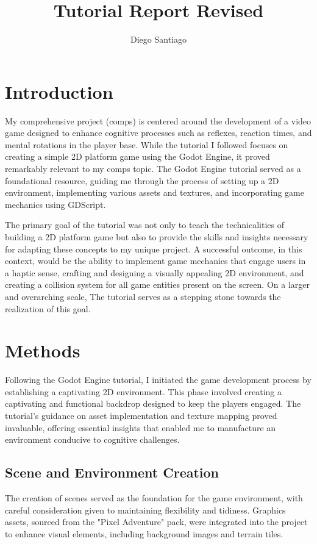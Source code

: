 \documentclass[10pt,twocolumn]{article}
\title{Tutorial Report Revised}
\author{Diego Santiago}
\affiliation{Occidental College}
\begin{document}
\maketitle

\section{Introduction}
My comprehensive project (comps) is centered around the development of a video game designed to enhance cognitive processes such as reflexes, reaction times, and mental rotations in the player base. While the tutorial I followed focuses on creating a simple 2D platform game using the Godot Engine, it proved remarkably relevant to my comps topic. The Godot Engine tutorial served as a foundational resource, guiding me through the process of setting up a 2D environment, implementing various assets and textures, and incorporating game mechanics using GDScript.

The primary goal of the tutorial was not only to teach the technicalities of building a 2D platform game but also to provide the skills and insights necessary for adapting these concepts to my unique project. A successful outcome, in this context, would be the ability to implement game mechanics that engage users in a haptic sense, crafting and designing a visually appealing 2D environment, and creating a collision system for all game entities present on the screen. On a larger and overarching scale, The tutorial serves as a stepping stone towards the realization of this goal.

\section{Methods}
Following the Godot Engine tutorial, I initiated the game development process by establishing a captivating 2D environment. This phase involved creating a captivating and functional backdrop designed to keep the players engaged. The tutorial's guidance on asset implementation and texture mapping proved invaluable, offering essential insights that enabled me to manufacture an environment conducive to cognitive challenges.

\subsection{Scene and Environment Creation}
The creation of scenes served as the foundation for the game environment, with careful consideration given to maintaining flexibility and tidiness. Graphics assets, sourced from the "Pixel Adventure" pack, were integrated into the project to enhance visual elements, including background images and terrain tiles.
\end{document}
